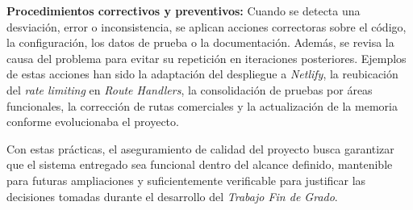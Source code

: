 \textbf{Procedimientos correctivos y preventivos:} Cuando se detecta una desviación, error o inconsistencia, se aplican acciones correctoras sobre el código, la configuración, los datos de prueba o la documentación. Además, se revisa la causa del problema para evitar su repetición en iteraciones posteriores. Ejemplos de estas acciones han sido la adaptación del despliegue a \textit{Netlify}, la reubicación del \textit{rate limiting} en \textit{Route Handlers}, la consolidación de pruebas por áreas funcionales, la corrección de rutas comerciales y la actualización de la memoria conforme evolucionaba el proyecto.

Con estas prácticas, el aseguramiento de calidad del proyecto busca garantizar que el sistema entregado sea funcional dentro del alcance definido, mantenible para futuras ampliaciones y suficientemente verificable para justificar las decisiones tomadas durante el desarrollo del \textit{Trabajo Fin de Grado}.
